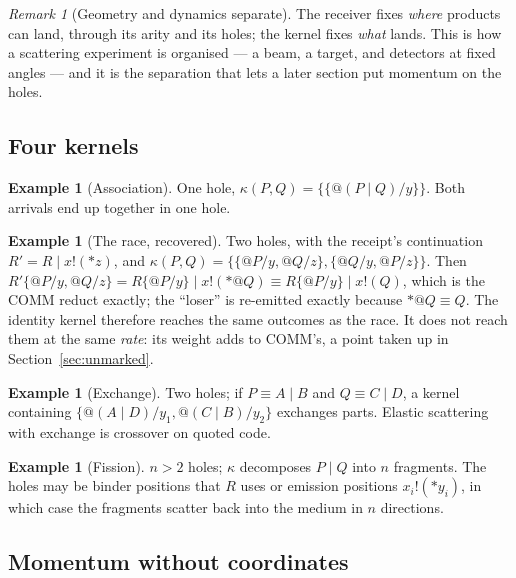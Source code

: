 \documentclass[11pt,a4paper]{article}
\theoremstyle{plain}
\theoremstyle{definition}
\newtheorem{example}[theorem]{Example}
\theoremstyle{remark}
\newtheorem{remark}[theorem]{Remark}
\newcommand{\scong}{\equiv}
\begin{document}
\begin{remark}[Geometry and dynamics separate]\label{rem:separate}
The receiver fixes \emph{where} products can land, through its arity and its
holes; the kernel fixes \emph{what} lands. This is how a scattering experiment
is organised --- a beam, a target, and detectors at fixed angles --- and it is
the separation that lets a later section put momentum on the holes.
\end{remark}

\subsection{Four kernels}\label{ssec:fourkernels}

\begin{example}[Association]\label{ex:assoc}
One hole, $\kappa(P,Q)=\{\{@(P\mid Q)/y\}\}$. Both arrivals end up together in
one hole.
\end{example}

\begin{example}[The race, recovered]\label{ex:race}
Two holes, with the receipt's continuation $R' = R \mid x!(*z)$, and
$\kappa(P,Q) = \{\{@P/y,@Q/z\},\{@Q/y,@P/z\}\}$. Then
$R'\{@P/y,@Q/z\} = R\{@P/y\}\mid x!(*@Q) \scong R\{@P/y\} \mid x!(Q)$, which is
the COMM reduct exactly; the ``loser'' is re-emitted exactly because
$*@Q\scong Q$. The identity kernel therefore reaches the same outcomes as the
race. It does not reach them at the same \emph{rate}: its weight adds to
COMM's, a point taken up in Section~\ref{sec:unmarked}.
\end{example}

\begin{example}[Exchange]\label{ex:exchange}
Two holes; if $P\scong A\mid B$ and $Q\scong C\mid D$, a kernel containing
$\{@(A\mid D)/y_1, @(C\mid B)/y_2\}$ exchanges parts. Elastic scattering with
exchange is crossover on quoted code.
\end{example}

\begin{example}[Fission]\label{ex:fission}
$n>2$ holes; $\kappa$ decomposes $P\mid Q$ into $n$ fragments. The holes may be
binder positions that $R$ uses or emission positions $x_i!(*y_i)$, in which
case the fragments scatter back into the medium in $n$ directions.
\end{example}

\subsection{Momentum without coordinates}\label{ssec:momentum}
\end{document}
